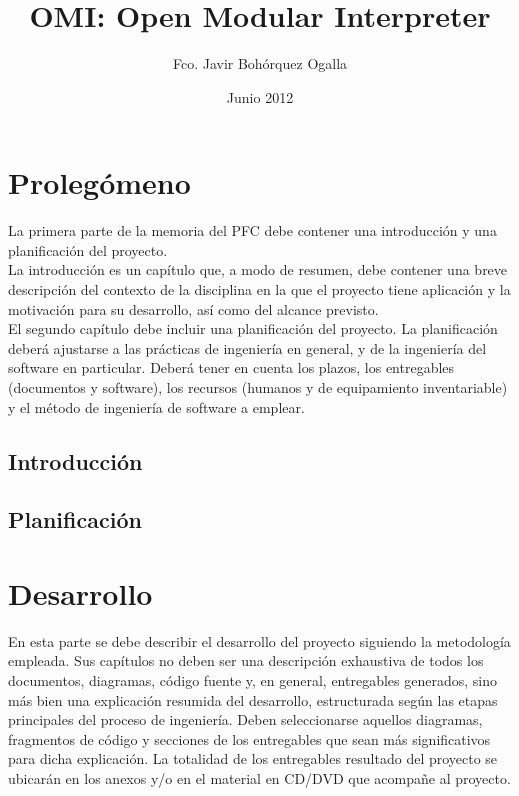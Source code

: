 \documentclass[a4paper,11pt]{book}
\title{OMI: Open Modular Interpreter}
\author{Fco. Javir Bohórquez Ogalla}
\date{Junio 2012}
\begin{document}
\pagestyle{empty}


\cleardoublepage


\cleardoublepage


\newpage


\newpage


\frontmatter

\tableofcontents
\listoffigures
\listoftables

\mainmatter

\part{Prolegómeno}
\null\vfill
\noindent La primera parte de la memoria del PFC debe contener una introducción y una planificación del proyecto.\\

La introducción es un capítulo que, a modo de resumen, debe contener una breve descripción del contexto de la disciplina en la que el proyecto tiene aplicación y la motivación para su desarrollo, así como del alcance previsto.\\

El segundo capítulo debe incluir una planificación del proyecto. La planificación deberá ajustarse a las prácticas de ingeniería en general, y de la ingeniería del software en particular. Deberá tener en cuenta los plazos, los entregables (documentos y software), los recursos (humanos y de equipamiento inventariable) y el método de ingeniería de software a emplear.
\\

\chapter{Introducción}


\chapter{Planificación}


\part{Desarrollo}
\null\vfill
\noindent En esta parte se debe describir el desarrollo del proyecto siguiendo la metodología empleada. Sus capítulos no deben ser una descripción exhaustiva de todos los documentos, diagramas, código fuente y, en general, entregables generados, sino más bien una explicación resumida del desarrollo, estructurada según las etapas principales del proceso de ingeniería. Deben seleccionarse aquellos diagramas, fragmentos de código y secciones de los entregables que sean más significativos para dicha explicación. La totalidad de los entregables resultado del proyecto se ubicarán en los anexos y/o en el material en CD/DVD que acompañe al proyecto.
\end{document}
